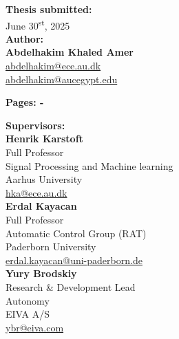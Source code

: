 \begin{minipage}[t]{0.485\textwidth}
\begin{flushleft}


\textbf{Thesis submitted:} \\[5pt]\hspace{2ex}
June 30\textsuperscript{st}, 2025
\\[5pt]
\textbf{Author:} \\[2pt]\hspace*{2ex}
\textbf{Abdelhakim Khaled Amer} \\\hspace*{2ex}
\href{mailto:olaya@ece.au.dk}{abdelhakim@ece.au.dk}\\\hspace*{2ex}
\href{mailto:oat@eiva.com}{abdelhakim@aucegypt.edu}\\\hspace*{2ex}

\textbf{Pages: -} \\
\end{flushleft}
\end{minipage}
\hfill
\begin{minipage}[t]{0.485\textwidth}
\begin{flushleft}

\textbf{Supervisors:} \\[5pt]

\textbf{Henrik Karstoft} \\
Full Professor \\
Signal Processing and Machine learning \\
Aarhus University \\
\href{mailto:hka@ece.au.dk}{hka@ece.au.dk} \\[5pt]

\textbf{Erdal Kayacan} \\
Full Professor \\
Automatic Control Group (RAT) \\
Paderborn University \\
\href{mailto:abkar@mpe.au.dk}{erdal.kayacan@uni-paderborn.de} \\[5pt]

\textbf{Yury Brodskiy} \\
Research \& Development Lead\\
Autonomy \\
EIVA A/S \\
\href{mailto:ybr@eiva.com}{ybr@eiva.com} \\

\end{flushleft}
\end{minipage}

